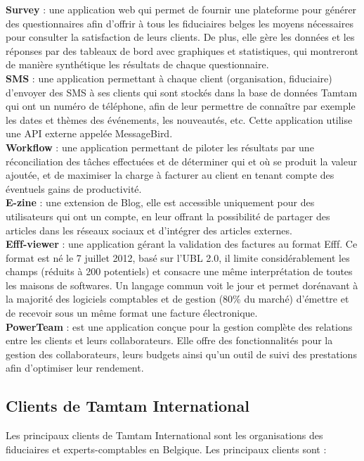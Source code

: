 \textbf{Survey} : une application web qui permet de fournir une plateforme pour générer des
questionnaires afin d'offrir à tous les fiduciaires belges les moyens nécessaires pour consulter
la satisfaction de leurs clients. De plus, elle gère les données et les réponses par des tableaux
de bord avec graphiques et statistiques, qui montreront de manière synthétique les résultats de
chaque questionnaire.\\[6pt]
\textbf{SMS} : une application permettant à chaque client (organisation, fiduciaire) d'envoyer des
SMS à ses clients qui sont stockés dans la base de données Tamtam qui ont un numéro de
téléphone, afin de leur permettre de connaître par exemple les dates et thèmes des événements,
les nouveautés, etc. Cette application utilise une API externe appelée MessageBird.\\[6pt]
\textbf{Workflow} : une application permettant de piloter les résultats par une réconciliation des
tâches effectuées et de déterminer qui et où se produit la valeur ajoutée, et de maximiser la
charge à facturer au client en tenant compte des éventuels gains de productivité.\\[6pt]
\textbf{E-zine} : une extension de Blog, elle est accessible uniquement pour des utilisateurs qui ont
un compte, en leur offrant la possibilité de partager des articles dans les réseaux sociaux et
d'intégrer des articles externes.\\[6pt]
\textbf{Efff-viewer} : une application gérant la validation des factures au format Efff. Ce format
est né le 7 juillet 2012, basé sur l'UBL 2.0, il limite considérablement les champs (réduits à
200 potentiels) et consacre une même interprétation de toutes les maisons de softwares. Un
langage commun voit le jour et permet dorénavant à la majorité des logiciels comptables et de
gestion (80\% du marché) d'émettre et de recevoir sous un même format une facture
électronique.\\[6pt]
\textbf{PowerTeam} : est une application conçue pour la gestion complète des relations entre les
clients et leurs collaborateurs. Elle offre des fonctionnalités pour la gestion des collaborateurs,
leurs budgets ainsi qu'un outil de suivi des prestations afin d'optimiser leur rendement.

\subsection{Clients de Tamtam International}

Les principaux clients de Tamtam International sont les organisations des fiduciaires et
experts-comptables en Belgique. Les principaux clients sont :

